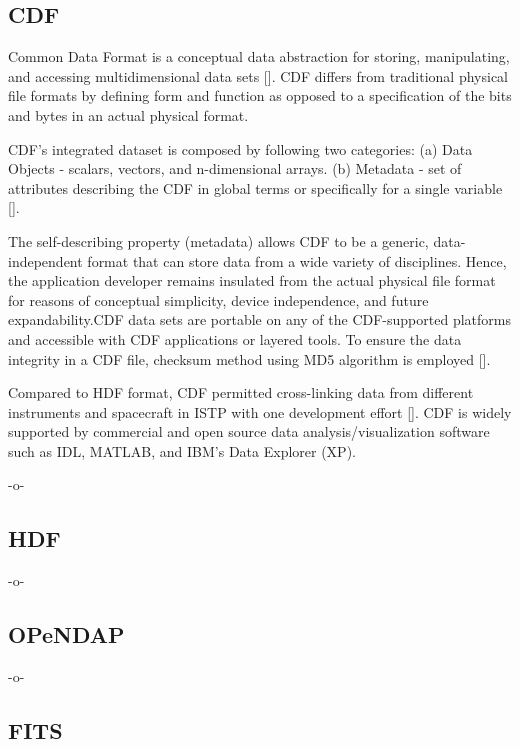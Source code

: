 \subsection{CDF }

Common Data Format is a conceptual data abstraction for storing,
manipulating, and accessing multidimensional data
sets [\cite{www-cdf}]. CDF differs from traditional physical file
formats by defining form and function as opposed to a specification of
the bits and bytes in an actual physical format.
 
CDF's integrated dataset is composed by following two categories:
(a) Data Objects - scalars, vectors, and n-dimensional
arrays. (b) Metadata - set of attributes describing the CDF in global
terms or specifically for a single variable [\cite{user-guide-cdf}].

The self-describing property (metadata) allows CDF to be a generic,
data-independent format that can store data from a wide variety of
disciplines. Hence, the application developer remains insulated from
the actual physical file format for reasons of conceptual simplicity,
device independence, and future expandability.CDF data sets are
portable on any of the CDF-supported platforms and accessible with CDF
applications or layered tools. To ensure the data integrity in a CDF
file, checksum method using MD5 algorithm is
employed [\cite{www-digitalpreserve}].

Compared to HDF format, CDF permitted cross-linking data from
different instruments and spacecraft in ISTP with one development
effort [\cite{www-wiki-hdf}].  CDF is widely supported by commercial and
open source data analysis/visualization software such as IDL, MATLAB,
and IBM's Data Explorer (XP).

     -o-

\subsection{HDF}

-o- 

\subsection{OPeNDAP}
-o-

\subsection{FITS}

